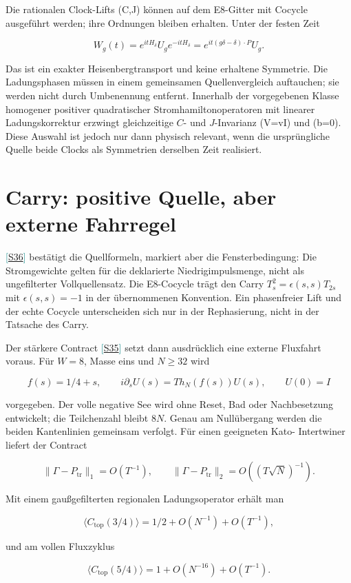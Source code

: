 \documentclass[11pt,a4paper,oneside,parskip=half,headings=normal,numbers=noenddot,bibliography=totoc]{scrreprt}
\newcommand{\src}[1]{\textcolor{teal}{\small[\hyperref[s:#1]{S#1}]}}
\begin{document}
Die rationalen Clock-Lifts (C,J) können auf dem E8-Gitter mit Cocycle
ausgeführt werden; ihre Ordnungen bleiben erhalten. Unter der festen Zeit

\[
 W_g(t)=e^{itH_\delta}U_g e^{-itH_\delta}
 =e^{it(g\delta-\delta)\cdot P}U_g.
\]

Das ist ein exakter Heisenbergtransport und keine erhaltene Symmetrie. Die
Ladungsphasen müssen in einem gemeinsamen Quellenvergleich auftauchen; sie
werden nicht durch Umbenennung entfernt. Innerhalb der vorgegebenen Klasse
homogener positiver quadratischer Stromhamiltonoperatoren mit linearer
Ladungskorrektur erzwingt gleichzeitige \(C\)- und \(J\)-Invarianz
(V=vI) und (b=0). Diese Auswahl ist jedoch nur dann physisch relevant,
wenn die ursprüngliche Quelle beide Clocks als Symmetrien derselben Zeit
realisiert.

\section{Carry: positive Quelle, aber externe Fahrregel}

\src{36} bestätigt die Quellformeln, markiert aber die
Fensterbedingung: Die Stromgewichte gelten für die deklarierte
Niedrigimpulsmenge, nicht als ungefilterter Vollquellensatz. Die E8-Cocycle
trägt den Carry \(T_s^2=\epsilon(s,s)T_{2s}\) mit
\(\epsilon(s,s)=-1\) in der übernommenen Konvention. Ein phasenfreier Lift
und der echte Cocycle unterscheiden sich nur in der Rephasierung, nicht in
der Tatsache des Carry.

Der stärkere Contract \src{35} setzt dann ausdrücklich
eine externe Fluxfahrt voraus. Für $W=8$, Masse eins und \(N\ge32\) wird

\[
 f(s)=1/4+s,\qquad i\partial_sU(s)=T h_N(f(s))U(s),\qquad U(0)=I
\]

vorgegeben. Der volle negative See wird ohne Reset, Bad oder Nachbesetzung
entwickelt; die Teilchenzahl bleibt \(8N\). Genau am Nullübergang werden die
beiden Kantenlinien gemeinsam verfolgt. Für einen geeigneten Kato-
Intertwiner liefert der Contract

\[
 \|\Gamma-P_\mathrm{tr}\|_1=O(T^{-1}),\qquad
 \|\Gamma-P_\mathrm{tr}\|_2=O((T\sqrt N)^{-1}).
\]

Mit einem gaußgefilterten regionalen Ladungsoperator erhält man

\[
 \langle C_\mathrm{top}(3/4)\rangle
 =1/2+O(N^{-1})+O(T^{-1}),
\]

und am vollen Fluxzyklus

\[
 \langle C_\mathrm{top}(5/4)\rangle
 =1+O(N^{-16})+O(T^{-1}).
\]
\end{document}
